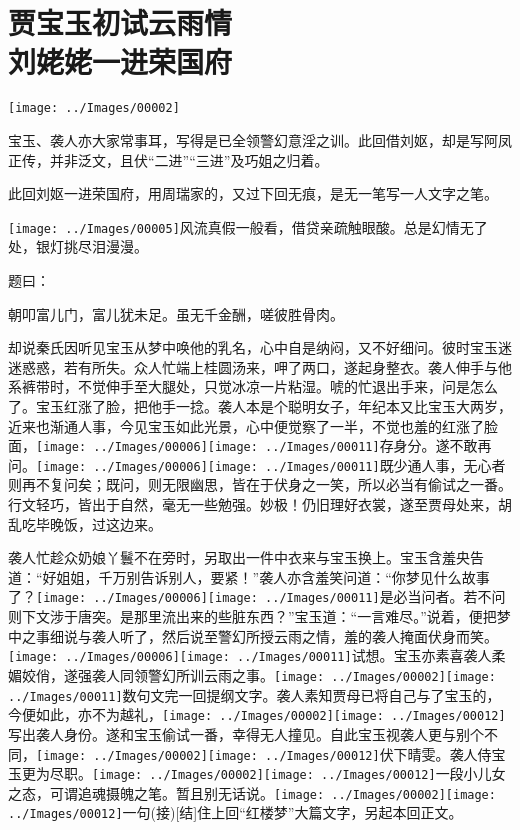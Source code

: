 

\chapter{贾宝玉初试云雨情\\刘姥姥一进荣国府}\label{part0010_split_000.htmlux5cux23calibre_pb_0}

\texttt{[image: ../Images/00002]}{\kaishu 宝玉、袭人亦大家常事耳，写得是已全领警幻意淫之训。此回借刘妪，却是写阿凤正传，并非泛文，且伏``二进''``三进''及巧姐之归着。

此回刘妪一进荣国府，用周瑞家的，又过下回无痕，是无一笔写一人文字之笔。

\texttt{[image: ../Images/00005]}风流真假一般看，借贷亲疏触眼酸。总是幻情无了处，银灯挑尽泪漫漫。}

题曰：

朝叩富儿门，富儿犹未足。虽无千金酬，嗟彼胜骨肉。

却说秦氏因听见宝玉从梦中唤他的乳名，心中自是纳闷，又不好细问。彼时宝玉迷迷惑惑，若有所失。众人忙端上桂圆汤来，呷了两口，遂起身整衣。袭人伸手与他系裤带时，不觉伸手至大腿处，只觉冰凉一片粘湿。唬的忙退出手来，问是怎么了。宝玉红涨了脸，把他手一捻。袭人本是个聪明女子，年纪本又比宝玉大两岁，近来也渐通人事，今见宝玉如此光景，心中便觉察了一半，不觉也羞的红涨了脸面，{\texttt{[image: ../Images/00006]}\texttt{[image: ../Images/00011]}\footnotesize \kaishu 存身分。}遂不敢再问。{\texttt{[image: ../Images/00006]}\texttt{[image: ../Images/00011]}\footnotesize \kaishu 既少通人事，无心者则再不复问矣；既问，则无限幽思，皆在于伏身之一笑，所以必当有偷试之一番。行文轻巧，皆出于自然，毫无一些勉强。妙极！}仍旧理好衣裳，遂至贾母处来，胡乱吃毕晚饭，过这边来。

袭人忙趁众奶娘丫鬟不在旁时，另取出一件中衣来与宝玉换上。宝玉含羞央告道：``好姐姐，千万别告诉别人，要紧！''袭人亦含羞笑问道：``你梦见什么故事了？{\texttt{[image: ../Images/00006]}\texttt{[image: ../Images/00011]}\footnotesize \kaishu 是必当问者。若不问则下文涉于唐突。}是那里流出来的些脏东西？''宝玉道：``一言难尽。''说着，便把梦中之事细说与袭人听了，然后说至警幻所授云雨之情，羞的袭人掩面伏身而笑。{\texttt{[image: ../Images/00006]}\texttt{[image: ../Images/00011]}\footnotesize \kaishu 试想。}宝玉亦素喜袭人柔媚姣俏，遂强袭人同领警幻所训云雨之事。{\texttt{[image: ../Images/00002]}\texttt{[image: ../Images/00011]}\footnotesize \kaishu 数句文完一回提纲文字。}袭人素知贾母已将自己与了宝玉的，今便如此，亦不为越礼，{\texttt{[image: ../Images/00002]}\texttt{[image: ../Images/00012]}\footnotesize \kaishu 写出袭人身份。}遂和宝玉偷试一番，幸得无人撞见。自此宝玉视袭人更与别个不同，{\texttt{[image: ../Images/00002]}\texttt{[image: ../Images/00012]}\footnotesize \kaishu 伏下晴雯。}袭人侍宝玉更为尽职。{\texttt{[image: ../Images/00002]}\texttt{[image: ../Images/00012]}\footnotesize \kaishu 一段小儿女之态，可谓追魂摄魄之笔。}暂且别无话说。{{\texttt{[image: ../Images/00002]}\texttt{[image: ../Images/00012]}\footnotesize \kaishu 一句{(接)}{[}结{]}住上回``红楼梦''大篇文字，另起本回正文。}}

